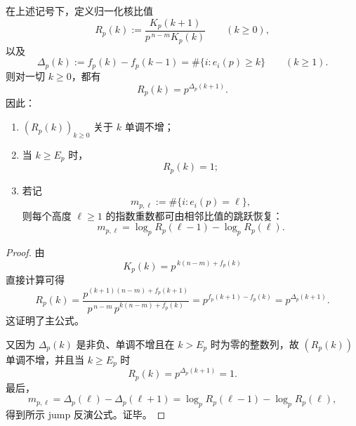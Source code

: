 \begin{theorem}\label{thm:conclusion-smith-pkernel-ratio-staircase-jump-inversion}
在上述记号下，定义归一化核比值
\[
R_p(k):=\frac{K_p(k+1)}{p^{\,n-m}K_p(k)}
\qquad(k\ge 0),
\]
以及
\[
\Delta_p(k):=f_p(k)-f_p(k-1)=\#\{i:e_i(p)\ge k\}
\qquad(k\ge 1).
\]
则对一切 \(k\ge 0\)，都有
\[
R_p(k)=p^{\Delta_p(k+1)}.
\]
因此：
\begin{enumerate}
  \item \((R_p(k))_{k\ge 0}\) 关于 \(k\) 单调不增；
  \item 当 \(k\ge E_p\) 时，
  \[
  R_p(k)=1;
  \]
  \item 若记
  \[
  m_{p,\ell}:=\#\{i:e_i(p)=\ell\},
  \]
  则每个高度 \(\ell\ge 1\) 的指数重数都可由相邻比值的跳跃恢复：
  \[
  m_{p,\ell}
  =
  \log_p R_p(\ell-1)-\log_p R_p(\ell).
  \]
\end{enumerate}
\end{theorem}
\begin{proof}
由
\[
K_p(k)=p^{\,k(n-m)+f_p(k)}
\]
直接计算可得
\[
R_p(k)
=
\frac{p^{(k+1)(n-m)+f_p(k+1)}}{p^{\,n-m}\,p^{k(n-m)+f_p(k)}}
=
p^{f_p(k+1)-f_p(k)}
=
p^{\Delta_p(k+1)}.
\]
这证明了主公式。

又因为 \(\Delta_p(k)\) 是非负、单调不增且在 \(k>E_p\) 时为零的整数列，故 \((R_p(k))\) 单调不增，并且当 \(k\ge E_p\) 时
\[
R_p(k)=p^{\Delta_p(k+1)}=1.
\]
最后，
\[
m_{p,\ell}
=
\Delta_p(\ell)-\Delta_p(\ell+1)
=
\log_pR_p(\ell-1)-\log_pR_p(\ell),
\]
得到所示 jump 反演公式。证毕。
\end{proof}

